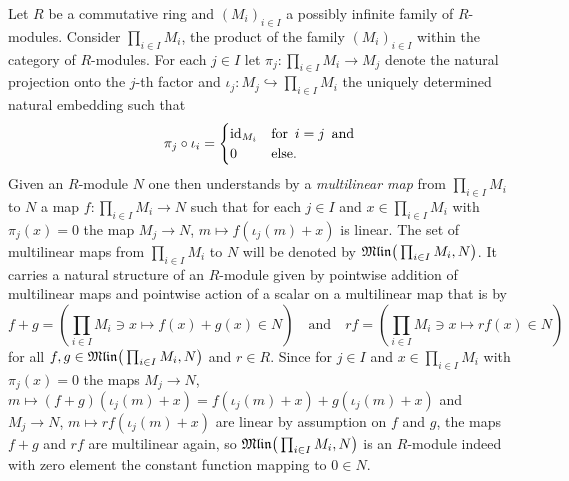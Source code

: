 \para\label{para:canonical-projections-embeddings-multilinear-maps}
Let $R$ be a commutative ring and $(M_i)_{i\in I}$ a possibly infinite family of $R$-modules.
Consider $\prod_{i\in I} M_i$, the product of the family $(M_i)_{i\in I}$  within the category
of $R$-modules. For each $j\in I$ let $\pi_j : \prod_{i\in I} M_i \to M_j $ denote the natural
projection onto the $j$-th factor and $\iota_j :M _j \hookrightarrow  \prod_{i\in I}M_i$ the
uniquely determined natural embedding such that 
\[
   \pi_j\circ \iota_i =  
   \begin{cases}
       \mathrm{id}_{M_i} & \text{for}\enspace i=j \enspace\text{and} \\
       0 & \text{else} .  
   \end{cases}
\]
Given an $R$-module $N$  one then understands by a \emph{multilinear map} from $ \prod_{i\in I}M_i$
to $N$ a map $f:  \prod_{i\in I}M_i \to N$
such that for each $j\in I$ and $x\in \prod_{i\in I} M_i$ with $\pi_j (x)=0$ the map $M_j\to N$, $m\mapsto f(\iota_j(m)+x)$ is linear.
The set of multilinear maps from $\prod_{i\in I} M_i$ to $N$ will be denoted by
$\mathfrak{Mlin} \big(\prod_{i\in I} M_i,N\big)$. It carries a natural structure of an $R$-module
given by pointwise addition of multilinear maps and pointwise action of a scalar on a
multilinear map that is by  
\[
  f+ g =  \left( \prod_{i\in I} M_i \ni x \mapsto f(x) + g(x) \in N \right) \quad\text{and}\quad
  r f =  \left( \prod_{i\in I} M_i \ni x \mapsto rf(x)\in N \right) 
\]
for all $f,g \in \mathfrak{Mlin} \big(\prod_{i\in I} M_i,N\big)$ and $r\in R$.
Since for $j\in I$ and $x\in \prod_{i\in I} M_i$ with $\pi_j(x)= 0$ the maps
$M_j\to N$, $m \mapsto (f+g) (\iota_j(m) + x) = f (\iota_j(m) + x) + g (\iota_j(m) + x)$
and $M_j\to N$, $m \mapsto rf (\iota_j(m) + x) $ are linear by assumption on $f$ and $g$,
the maps $f+g$ and $rf$ are multilinear again, so $ \mathfrak{Mlin}\big(\prod_{i\in I} M_i,N\big)$ is an
$R$-module indeed with zero element the constant function mapping to $0\in N$. 

